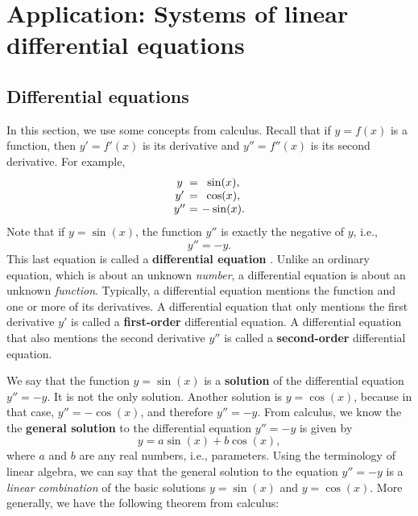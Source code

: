 \section{Application: Systems of linear differential equations}

\subsection{Differential equations}

In this section, we use some concepts from calculus. Recall that if
$y=f(x)$ is a function, then $y' = f'(x)$ is its derivative%
 and $y'' = f''(x)$ is its second derivative.  For
example,
\begin{equation*}
  \begin{array}{c@{~}c@{~}c}
    y &=& \sin(x),\\
    y' &=& \cos(x),\\
    y''&=& -\sin(x).\\
  \end{array}
\end{equation*}
Note that if $y=\sin(x)$, the function $y''$ is exactly the negative
of $y$, i.e.,
\begin{equation}
  y'' = -y.
\end{equation}
This last equation is called a \textbf{differential equation}%
%
. Unlike an ordinary equation, which is
about an unknown {\em number}, a differential equation is about an
unknown {\em function}. Typically, a differential equation mentions
the function and one or more of its derivatives. A differential
equation that only mentions the first derivative $y'$ is called a
\textbf{first-order}%
 differential equation. A
differential equation that also mentions the second derivative $y''$
is called a \textbf{second-order}%
 differential equation.

We say that the function $y=\sin(x)$ is a \textbf{solution}%
 of the differential equation
$y'' = -y$. It is not the only solution. Another solution is
$y=\cos(x)$, because in that case, $y''=-\cos(x)$, and therefore
$y''=-y$. From calculus, we know the the \textbf{general solution} to
the differential equation $y'' = -y$ is given by
\begin{equation*}
  y = a\sin(x) + b\cos(x),
\end{equation*}
where $a$ and $b$ are any real numbers, i.e., parameters. Using the
terminology of linear algebra, we can say that the general solution to
the equation $y'' = -y$ is a {\em linear combination} of the basic
solutions $y=\sin(x)$ and $y=\cos(x)$. More generally, we have the
following theorem from calculus:


